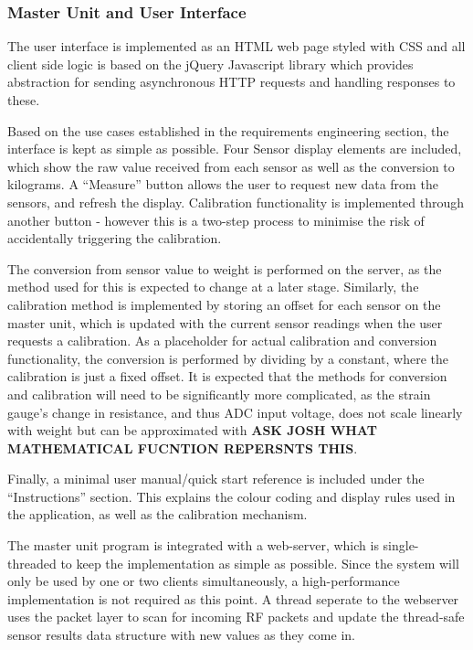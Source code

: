 \subsubsection{Master Unit and User Interface}
The user interface is implemented as an HTML web page styled with CSS and all client side logic is based on the jQuery Javascript library \cite{jquery} which provides abstraction for sending asynchronous HTTP requests and handling responses to these.

Based on the use cases established in the requirements engineering section, the interface is kept as simple as possible. Four Sensor display elements are included, which show the raw value received from each sensor as well as the conversion to kilograms. A ``Measure'' button allows the user to request new data from the sensors, and refresh the display. Calibration functionality is implemented through another button - however this is a two-step process to minimise the risk of accidentally triggering the calibration.

The conversion from sensor value to weight is performed on the server, as the method used for this is expected to change at a later stage. Similarly, the calibration method is implemented by storing an offset for each sensor on the master unit, which is updated with the current sensor readings when the user requests a calibration. As a placeholder for actual calibration and conversion functionality, the conversion is performed by dividing by a constant, where the calibration is just a fixed offset. It is expected that the methods for conversion and calibration will need to be significantly more complicated, as the strain gauge's change in resistance, and thus ADC input voltage, does not scale linearly with weight but can be approximated with \textbf{ASK JOSH WHAT MATHEMATICAL FUCNTION REPERSNTS THIS}.

Finally, a minimal user manual/quick start reference is included under the ``Instructions'' section. This explains the colour coding and display rules used in the application, as well as the calibration mechanism.

The master unit program is integrated with a web-server, which is single-threaded to keep the implementation as simple as possible. Since the system will only be used by one or two clients simultaneously, a high-performance implementation is not required as this point. A thread seperate to the webserver uses the packet layer to scan for incoming RF packets and update the thread-safe sensor results data structure with new values as they come in.

